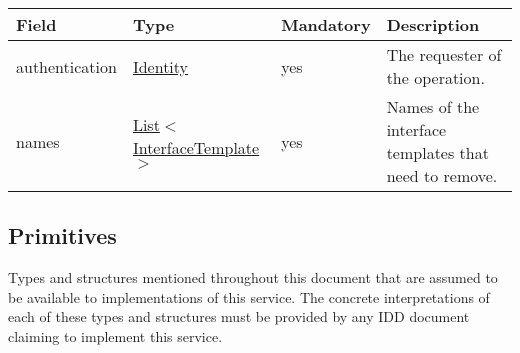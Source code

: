 \documentclass[a4paper]{arrowhead}
\newcommand{\pref}[1]{{\textcolor{ArrowheadGrey}{\hyperref[sec:model:primitives:#1]{#1}}}}
\begin{document}
\clearpage

\label{sec:model:InterfaceTemplateRemoveRequest}

\begin{table}[ht!]
\begin{tabularx}{\textwidth}{| p{4.1cm} | p{4.8cm} | p{2cm} | X |} \hline
\rowcolor{gray!33} Field & Type & Mandatory & Description \\ \hline
authentication & \hyperref[sec:model:Identity]{Identity} & yes & The requester of the operation. \\ \hline
names &  \pref{List}$<$\pref{InterfaceTemplate}$>$ & yes & Names of the interface templates that need to remove. \\ \hline
\end{tabularx}
\end{table}

\subsection{Primitives}
\label{sec:model:primitives}

Types and structures mentioned throughout this document that are assumed to be available to implementations of this service.
The concrete interpretations of each of these types and structures must be provided by any IDD document claiming to implement this service.
\end{document}
